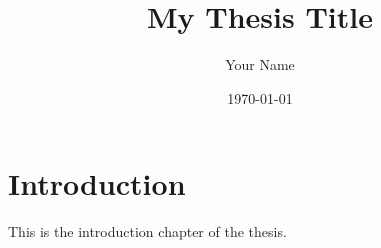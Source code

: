 \documentclass[12pt,a4paper]{report}
\title{My Thesis Title}
\author{Your Name}
\date{\today}
\begin{document}
\maketitle

\tableofcontents

\chapter{Introduction}
This is the introduction chapter of the thesis.
\end{document}
